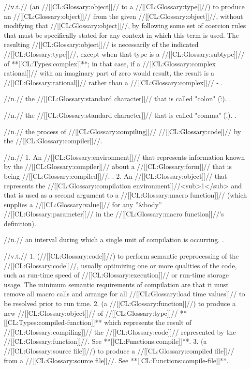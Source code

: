  //v.t.// (an //[[CL:Glossary:object]]// to a //[[CL:Glossary:type]]//) to produce an //[[CL:Glossary:object]]// from the given //[[CL:Glossary:object]]//, without modifying that //[[CL:Glossary:object]]//, by following some set of coercion rules that must be specifically stated for any context in which this term is used. The resulting //[[CL:Glossary:object]]// is necessarily of the indicated //[[CL:Glossary:type]]//, except when that type is a //[[CL:Glossary:subtype]]// of **[[CL:Types:complex]]**; in that case, if a //[[CL:Glossary:complex rational]]// with an imaginary part of zero would result, the result is a //[[CL:Glossary:rational]]// rather than a //[[CL:Glossary:complex]]// - \seesection\RuleOfCanonRepForComplexRationals.

 //n.// the //[[CL:Glossary:standard character]]// that is called "colon" (\f{:}). \Seefigure\StdCharsThree.

 //n.// the //[[CL:Glossary:standard character]]// that is called "comma" (\f{,}). \Seefigure\StdCharsThree.

 //n.// the process of //[[CL:Glossary:compiling]]// //[[CL:Glossary:code]]// by the //[[CL:Glossary:compiler]]//.

 //n.// 1. An //[[CL:Glossary:environment]]// that represents information known by the //[[CL:Glossary:compiler]]// about a //[[CL:Glossary:form]]// that is being //[[CL:Glossary:compiled]]//. \Seesection\CompilationTerms. 2. An //[[CL:Glossary:object]]// that represents the //[[CL:Glossary:compilation environment]]//<sub>1</sub> and that is used as a second argument to a //[[CL:Glossary:macro function]]// (which supplies a //[[CL:Glossary:value]]// for any ''&body'' //[[CL:Glossary:parameter]]// in the //[[CL:Glossary:macro function]]//'s definition).

 //n.// an interval during which a single unit of compilation is occurring. .

 //v.t.// 1. (//[[CL:Glossary:code]]//) to perform semantic preprocessing of the //[[CL:Glossary:code]]//, usually optimizing one or more qualities of the code, such as run-time speed of //[[CL:Glossary:execution]]// or run-time storage usage. The minimum semantic requirements of compilation are that it must remove all macro calls and arrange for all //[[CL:Glossary:load time values]]// to be resolved prior to run time. 2. (a //[[CL:Glossary:function]]//) to produce a new //[[CL:Glossary:object]]// of //[[CL:Glossary:type]]// **[[CL:Types:compiled-function]]** which represents the result of //[[CL:Glossary:compiling]]// the //[[CL:Glossary:code]]// represented by the //[[CL:Glossary:function]]//. See **[[CL:Functions:compile]]**. 3. (a //[[CL:Glossary:source file]]//) to produce a //[[CL:Glossary:compiled file]]// from a //[[CL:Glossary:source file]]//. See **[[CL:Functions:compile-file]]**.

